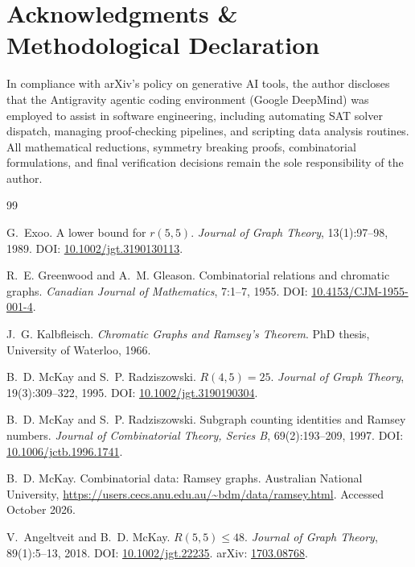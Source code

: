 \documentclass[11pt,a4paper]{article}
\theoremstyle{definition}
\begin{document}
\section*{Acknowledgments \& Methodological Declaration}
In compliance with arXiv's policy on generative AI tools, the author discloses that the Antigravity agentic coding environment (Google DeepMind) was employed to assist in software engineering, including automating SAT solver dispatch, managing proof-checking pipelines, and scripting data analysis routines. All mathematical reductions, symmetry breaking proofs, combinatorial formulations, and final verification decisions remain the sole responsibility of the author.

\begin{thebibliography}{99}

G.~Exoo.
\newblock A lower bound for $r(5, 5)$.
\newblock \emph{Journal of Graph Theory}, 13(1):97--98, 1989.
\newblock DOI: \href{https://doi.org/10.1002/jgt.3190130113}{10.1002/jgt.3190130113}.

R.~E. Greenwood and A.~M. Gleason.
\newblock Combinatorial relations and chromatic graphs.
\newblock \emph{Canadian Journal of Mathematics}, 7:1--7, 1955.
\newblock DOI: \href{https://doi.org/10.4153/CJM-1955-001-4}{10.4153/CJM-1955-001-4}.

J.~G. Kalbfleisch.
\newblock \emph{Chromatic Graphs and Ramsey's Theorem}.
\newblock PhD thesis, University of Waterloo, 1966.

B.~D. McKay and S.~P. Radziszowski.
\newblock $R(4, 5) = 25$.
\newblock \emph{Journal of Graph Theory}, 19(3):309--322, 1995.
\newblock DOI: \href{https://doi.org/10.1002/jgt.3190190304}{10.1002/jgt.3190190304}.

B.~D. McKay and S.~P. Radziszowski.
\newblock Subgraph counting identities and Ramsey numbers.
\newblock \emph{Journal of Combinatorial Theory, Series B}, 69(2):193--209, 1997.
\newblock DOI: \href{https://doi.org/10.1006/jctb.1996.1741}{10.1006/jctb.1996.1741}.

B.~D. McKay.
\newblock Combinatorial data: Ramsey graphs.
\newblock Australian National University, \url{https://users.cecs.anu.edu.au/~bdm/data/ramsey.html}. Accessed October 2026.

V.~Angeltveit and B.~D. McKay.
\newblock $R(5,5) \le 48$.
\newblock \emph{Journal of Graph Theory}, 89(1):5--13, 2018.
\newblock DOI: \href{https://doi.org/10.1002/jgt.22235}{10.1002/jgt.22235}.
\newblock arXiv: \href{https://arxiv.org/abs/1703.08768}{1703.08768}.


\end{thebibliography}
\end{document}

